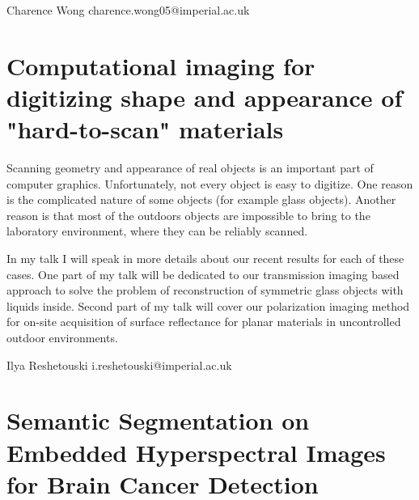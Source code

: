 \documentclass{article}
\begin{document}
Charence Wong
charence.wong05@imperial.ac.uk
\section*{Computational imaging for digitizing shape and appearance of "hard-to-scan"
materials}

Scanning geometry and appearance of real objects is an important
part of computer graphics. Unfortunately, not every object is easy to digitize.
One reason is the complicated nature of some objects (for example glass
objects). Another reason is that most of the outdoors objects are impossible to
bring to the laboratory environment, where they can be reliably scanned.

In my talk I will speak in more details about our recent results for each of
these cases. One part of my talk will be dedicated to our transmission imaging
based approach to solve the problem of reconstruction of symmetric glass objects
with liquids inside. Second part of my talk will cover our polarization imaging
method for on-site acquisition of surface reflectance for planar materials in
uncontrolled outdoor environments.


Ilya Reshetouski
i.reshetouski@imperial.ac.uk
\section*{Semantic Segmentation on Embedded Hyperspectral Images for Brain Cancer
Detection}
\end{document}
